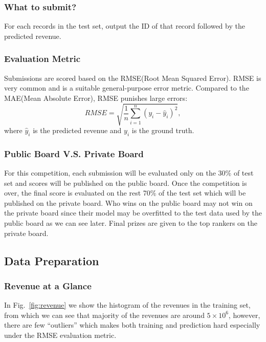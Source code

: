 \documentclass[10pt, oneside]{article}   	%
\newcommand\figref{Fig.~\ref}
\begin{document}
\subsubsection{What to submit?}
For each records in the test set, output the ID of that record followed by the predicted revenue.

\subsubsection{Evaluation Metric}
Submissions are scored based on the RMSE(Root Mean Squared Error). 
RMSE is very common and is a suitable general-purpose error metric. 
Compared to the MAE(Mean Absolute Error), RMSE punishes large errors:
\begin{equation*}
RMSE = \sqrt{\frac{1}{n} \sum_{i=1}^{n} (y_i - \hat{y}_i)^2 }, 
\end{equation*}
where $\hat{y}_i$ is the predicted revenue and $y_i$ is the ground truth.

\subsubsection{Public Board V.S. Private Board}
For this competition, each submission will be evaluated only on the 30\% of test set and scores will be published on the public board.
Once the competition is over, the final score is evaluated on the rest 70\% of the test set which will be published on the private board. 
Who wins on the public board may not win on the private board since their model may be overfitted to the test data used by the public board as we can see later.
Final prizes are given to the top rankers on the private board.
   
\subsection{Data Preparation}
\subsubsection{Revenue at a Glance}
In \figref{fig:revenue} we show the histogram of the revenues in the training set, from which we can see that majority of the revenues are around $5 \times 10^6$, 
however, there are few ``outliers'' which makes both training and prediction hard especially under the RMSE evaluation metric.
\end{document}
